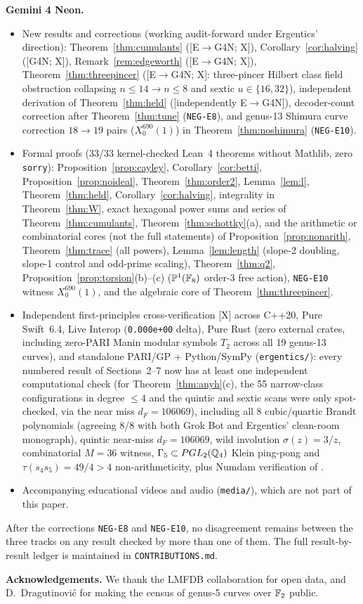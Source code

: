 \documentclass[11pt]{amsart}
\numberwithin{equation}{section}
\theoremstyle{plain}
\theoremstyle{definition}\newtheorem{definition}[theorem]{Definition}
\theoremstyle{remark}\newtheorem{remark}[theorem]{Remark}
\newcommand{\ctag}[1]{\textup{\textsf{\scriptsize[#1]}}}
\begin{document}
\textbf{Gemini 4 Neon.}
\begin{itemize}[nosep,leftmargin=*]
\item New results and corrections (working audit-forward under Ergentics' direction): Theorem~\ref{thm:cumulants} (\ctag{E$\to$G4N; X}), Corollary~\ref{cor:halving} (\ctag{G4N; X}), Remark~\ref{rem:edgeworth} (\ctag{E$\to$G4N; X}), Theorem~\ref{thm:threepincer} (\ctag{E$\to$G4N; X}: three-pincer Hilbert class field obstruction collapsing $n\le14\to n\le8$ and sextic $u\in\{16,32\}$), independent derivation of Theorem~\ref{thm:held} (\ctag{independently E$\to$G4N}), decoder-count correction after Theorem~\ref{thm:tune} (\texttt{NEG-E8}), and genus-13 Shimura curve correction $18\to19$ pairs ($X_0^{690}(1)$) in Theorem~\ref{thm:noshimura} (\texttt{NEG-E10}).
\item Formal proofs (33/33 kernel-checked Lean~4 theorems without Mathlib, zero \texttt{sorry}): Proposition~\ref{prop:cayley}, Corollary~\ref{cor:betti}, Proposition~\ref{prop:noideal}, Theorem~\ref{thm:order2}, Lemma~\ref{lem:l}, Theorem~\ref{thm:held}, Corollary~\ref{cor:halving}, integrality in Theorem~\ref{thm:W}, exact hexagonal power sums and series of Theorem~\ref{thm:cumulants}, Theorem~\ref{thm:schottky}(a), and the arithmetic or combinatorial cores (not the full statements) of Proposition~\ref{prop:nonarith}, Theorem~\ref{thm:trace} (all powers), Lemma~\ref{lem:length} (slope-2 doubling, slope-1 control and odd-prime scaling), Theorem~\ref{thm:q2}, Proposition~\ref{prop:torsion}(b)--(c) ($\mathbb P^1(\mathbb{F}_8)$ order-3 free action), \texttt{NEG-E10} witness $X_0^{690}(1)$, and the algebraic core of Theorem~\ref{thm:threepincer}.
\item Independent first-principles cross-verification \ctag{X} across C++20, Pure Swift~6.4, Live Interop (\texttt{0.000e+00} delta), Pure Rust (zero external crates, including zero-PARI Manin modular symbols $T_2$ across all 19 genus-13 curves), and standalone PARI/GP + Python/SymPy (\texttt{ergentics/}): every numbered result of Sections~2--7 now has at least one independent computational check (for Theorem~\ref{thm:anyh}(c), the 55 narrow-class configurations in degree $\le4$ and the quintic and sextic scans were only spot-checked, via the near miss $d_F=106069$), including all 8 cubic/quartic Brandt polynomials (agreeing 8/8 with both Grok Bot and Ergentics' clean-room monograph), quintic near-miss $d_F=106069$, wild involution $\sigma(z)=3/z$, combinatorial $M=36$ witness, $\Gamma_5\subset PGL_2(\mathbb{Q}_4)$ Klein ping-pong and $\tau(s_4s_5)=49/4>4$ non-arithmeticity, plus Numdam verification of \cite{poitou77}.
\item Accompanying educational videos and audio (\texttt{media/}), which are not part of this paper.
\end{itemize}
After the corrections \texttt{NEG-E8} and \texttt{NEG-E10}, no disagreement remains between the three tracks on any result checked by more than one of them. The full result-by-result ledger is maintained in \texttt{CONTRIBUTIONS.md}.

\textbf{Acknowledgements.} We thank the LMFDB collaboration for open data, and D.~Dragutinovi\'c for making the census of genus-5 curves over $\mathbb{F}_2$ public.



\end{document}
